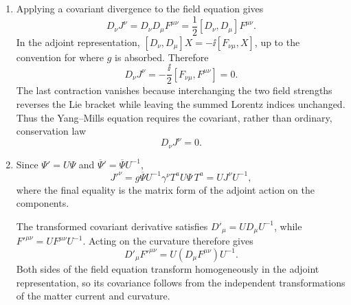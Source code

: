 \begin{enumerate}
  \begin{enumerate}
    \item[(a)]
    Applying a covariant divergence to the field equation gives
    \[
      D_\nu J^\nu=D_\nu D_\mu F^{\mu\nu}
        =\frac12[D_\nu,D_\mu]F^{\mu\nu}.
    \]
    In the adjoint representation,
    \([D_\nu,D_\mu]X=-\ii[F_{\nu\mu},X]\), up to the convention for where
    \(g\) is absorbed.  Therefore
    \[
      D_\nu J^\nu
        =-\frac{\ii}{2}[F_{\nu\mu},F^{\mu\nu}]=0.
    \]
    The last contraction vanishes because interchanging the two field
    strengths reverses the Lie bracket while leaving the summed Lorentz
    indices unchanged.  Thus the Yang--Mills equation requires the
    covariant, rather than ordinary, conservation law
    \[
      \boxed{D_\nu J^\nu=0.}
    \]
    \item[(b)]
    Since \(\Psi'=U\Psi\) and
    \(\overline\Psi'=\overline\Psi U^{-1}\),
    \[
      J'^\nu
        =g\overline\Psi U^{-1}\gamma^\nu T^aU\Psi\,T^a
        =UJ^\nu U^{-1},
    \]
    where the final equality is the matrix form of the adjoint action on
    the components.

    The transformed covariant derivative satisfies
    \(D'_\mu=UD_\mu U^{-1}\), while
    \(F'^{\mu\nu}=UF^{\mu\nu}U^{-1}\).  Acting on the curvature therefore
    gives
    \[
      D'_\mu F'^{\mu\nu}
        =U(D_\mu F^{\mu\nu})U^{-1}.
    \]
    Both sides of the field equation transform homogeneously in the
    adjoint representation, so its covariance follows from the independent
    transformations of the matter current and curvature.
  \end{enumerate}


\end{enumerate}
